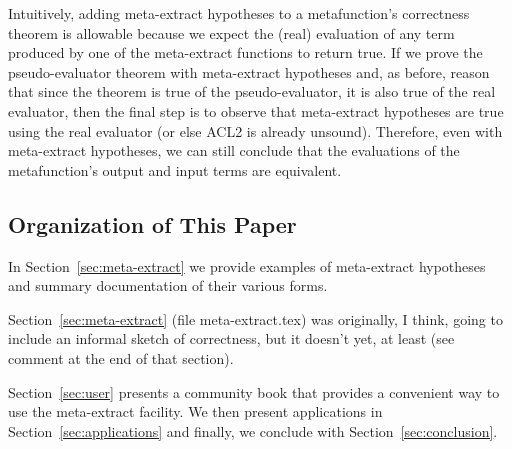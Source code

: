 Intuitively, adding meta-extract hypotheses to a metafunction's
correctness theorem is allowable because we expect the (real)
evaluation of any term produced by one of the meta-extract functions
to return true.  If we prove the pseudo-evaluator theorem with
meta-extract hypotheses and, as before, reason that since the theorem
is true of the pseudo-evaluator, it is also true of the real
evaluator, then the final step is to observe that meta-extract
hypotheses are true using the real evaluator (or else ACL2 is already
unsound).  Therefore, even with meta-extract hypotheses, we can still
conclude that the evaluations of the metafunction's output and input
terms are equivalent.

\subsection{Organization of This Paper}

In Section~\ref{sec:meta-extract} we provide examples of meta-extract
hypotheses and summary documentation of their various forms.

\begin{mycomment}
  \noindent Section~\ref{sec:meta-extract} (file meta-extract.tex) was
  originally, I think, going to include an informal sketch of
  correctness, but it doesn't yet, at least (see comment at the end of
  that section).
\end{mycomment}

\noindent Section~\ref{sec:user} presents a community book that
provides a convenient way to use the meta-extract facility.  We then
present applications in Section~\ref{sec:applications} and finally, we
conclude with Section~\ref{sec:conclusion}.
